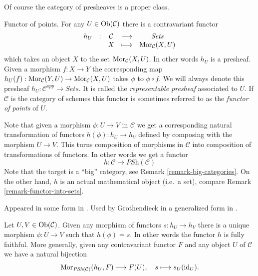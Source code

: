 \noindent
Of course the category of presheaves is a proper class.

\begin{example}
\label{example-hom-functor}
Functor of points.
For any $U\in \mathop{\mathrm{Ob}}\nolimits(\mathcal{C})$ there is a contravariant
functor
$$
\begin{matrix}
h_U & : & \mathcal{C}
&
\longrightarrow
&
\textit{Sets} \\
& &
X
&
\longmapsto
&
\mathop{\mathrm{Mor}}\nolimits_\mathcal{C}(X, U)
\end{matrix}
$$
which takes an object $X$ to the set
$\mathop{\mathrm{Mor}}\nolimits_\mathcal{C}(X, U)$. In other words $h_U$ is a presheaf.
Given a morphism $f : X\to Y$ the corresponding map
$h_U(f) : \mathop{\mathrm{Mor}}\nolimits_\mathcal{C}(Y, U)\to \mathop{\mathrm{Mor}}\nolimits_\mathcal{C}(X, U)$
takes $\phi$ to $\phi\circ f$. We will always denote
this presheaf $h_U : \mathcal{C}^{opp} \to \textit{Sets}$.
It is called the {\it representable presheaf} associated to $U$.
If $\mathcal{C}$ is the category of schemes this functor is
sometimes referred to as the
\emph{functor of points} of $U$.
\end{example}

\noindent
Note that given a morphism $\phi : U \to V$ in $\mathcal{C}$ we get a
corresponding natural transformation of functors $h(\phi) : h_U \to h_V$
defined by composing with the morphism $U \to V$. This turns
composition of morphisms in $\mathcal{C}$ into composition of
transformations of functors. In other words we get a functor
$$
h :
\mathcal{C}
\longrightarrow
\textit{PSh}(\mathcal{C})
$$
Note that the target is a ``big'' category, see
Remark \ref{remark-big-categories}. On the other hand,
$h$ is an actual mathematical object (i.e.\ a set), compare Remark
\ref{remark-functor-into-sets}.

\begin{lemma}
\label{lemma-yoneda}
\begin{reference}
Appeared in some form in \cite{Yoneda-homology}. Used by Grothendieck in a
generalized form in \cite{Gr-II}.
\end{reference}
Let $U, V \in \mathop{\mathrm{Ob}}\nolimits(\mathcal{C})$.
Given any morphism of functors $s : h_U \to h_V$
there is a unique morphism $\phi : U \to V$
such that $h(\phi) = s$. In other words the
functor $h$ is fully faithful. More generally,
given any contravariant functor $F$ and any object
$U$ of $\mathcal{C}$ we have a natural bijection
$$
\mathop{\mathrm{Mor}}\nolimits_{\textit{PSh}(\mathcal{C})}(h_U, F) \longrightarrow F(U),
\quad
s \longmapsto s_U(\text{id}_U).
$$
\end{lemma}

